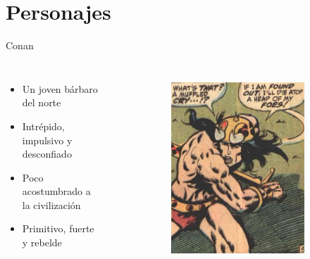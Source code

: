 \section{Personajes}
\note[itemize]{
	\item
}

\begin{frame}{Conan}
\begin{columns}
\begin{itemize}
 \item Un joven bárbaro del norte
 \item Intrépido, impulsivo y desconfiado
 \item Poco acostumbrado a la civilización
 \item Primitivo, fuerte y rebelde
\end{itemize}
\begin{figure}[htp]
 \centering
 \begin{subfigure}[b]{0.3\textwidth}
   \includegraphics[width=\textwidth]{img/conan/CTB}

\end{subfigure}
\end{figure}
\end{columns}
\end{frame}
